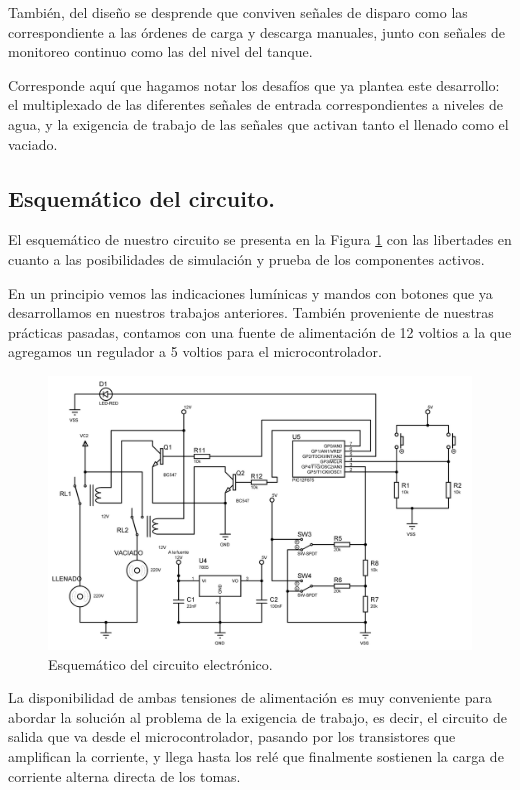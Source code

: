 \documentclass[a4paper]{article}
\begin{document}
También, del diseño se desprende que conviven señales de 
disparo como las correspondiente a las órdenes de carga y
descarga manuales, junto con señales de monitoreo continuo
como las del nivel del tanque.

Corresponde aquí que hagamos notar los desafíos que ya 
plantea este desarrollo: el multiplexado de las diferentes
señales de entrada correspondientes a niveles de agua, y 
la exigencia de trabajo de las señales que activan tanto el
llenado como el vaciado.

\subsection{Esquemático del circuito.}

El esquemático de nuestro circuito se presenta en la Figura
\ref{fig:esquematico} con las libertades en cuanto a las
posibilidades de simulación y prueba de los componentes 
activos.

En un principio vemos las indicaciones lumínicas y mandos 
con botones que ya desarrollamos en nuestros trabajos 
anteriores. También proveniente de nuestras prácticas
pasadas, contamos con una fuente de alimentación de 12 
voltios a la que agregamos un regulador a 5 voltios para el 
microcontrolador.

\begin{figure}[h]\centering
    \includegraphics[width=\textwidth]{tp3.jpg}
    \caption{Esquemático del circuito electrónico.}
    \label{fig:esquematico}
\end{figure}

La disponibilidad de ambas tensiones de alimentación es 
muy conveniente para abordar la solución al problema de 
la exigencia de trabajo, es decir, el circuito de salida 
que va desde el microcontrolador, pasando por los 
transistores que amplifican la corriente, y llega hasta 
los relé que finalmente sostienen la carga de corriente 
alterna directa de los tomas. 
\end{document}
